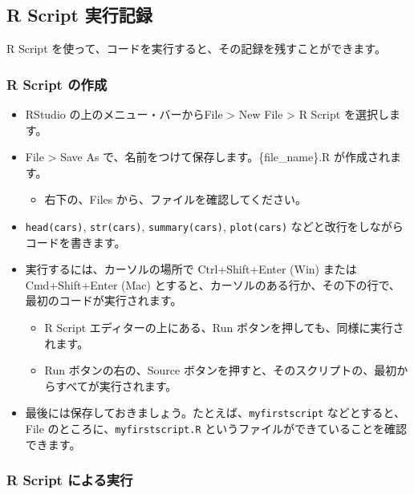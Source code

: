 \documentclass[
]{bxjsbook}
\providecommand{\tightlist}{%
  \setlength{\itemsep}{0pt}\setlength{\parskip}{0pt}}
\theoremstyle{definition}
\theoremstyle{definition}
\theoremstyle{definition}
\theoremstyle{definition}
\theoremstyle{remark}
\begin{document}
\hypertarget{r-script-ux5b9fux884cux8a18ux9332}{%
\subsection{R Script 実行記録}\label{r-script-ux5b9fux884cux8a18ux9332}}

R Script を使って、コードを実行すると、その記録を残すことができます。

\hypertarget{r-script-ux306eux4f5cux6210}{%
\subsubsection{R Script の作成}\label{r-script-ux306eux4f5cux6210}}

\begin{itemize}
\tightlist
\item
  RStudio の上のメニュー・バーからFile \textgreater{} New File \textgreater{} R Script を選択します。
\item
  File \textgreater{} Save As で、名前をつけて保存します。\{file\_name\}.R が作成されます。

  \begin{itemize}
  \tightlist
  \item
    右下の、Files から、ファイルを確認してください。
  \end{itemize}
\item
  \texttt{head(cars)}, \texttt{str(cars)}, \texttt{summary(cars)}, \texttt{plot(cars)} などと改行をしながらコードを書きます。
\item
  実行するには、カーソルの場所で Ctrl+Shift+Enter (Win) または Cmd+Shift+Enter (Mac) とすると、カーソルのある行か、その下の行で、最初のコードが実行されます。

  \begin{itemize}
  \tightlist
  \item
    R Script エディターの上にある、Run ボタンを押しても、同様に実行されます。
  \item
    Run ボタンの右の、Source ボタンを押すと、そのスクリプトの、最初からすべてが実行されます。
  \end{itemize}
\item
  最後には保存しておきましょう。たとえば、\texttt{myfirstscript} などとすると、File のところに、\texttt{myfirstscript.R} というファイルができていることを確認できます。
\end{itemize}

\hypertarget{r-script-ux306bux3088ux308bux5b9fux884c}{%
\subsubsection{R Script による実行}\label{r-script-ux306bux3088ux308bux5b9fux884c}}
\end{document}
